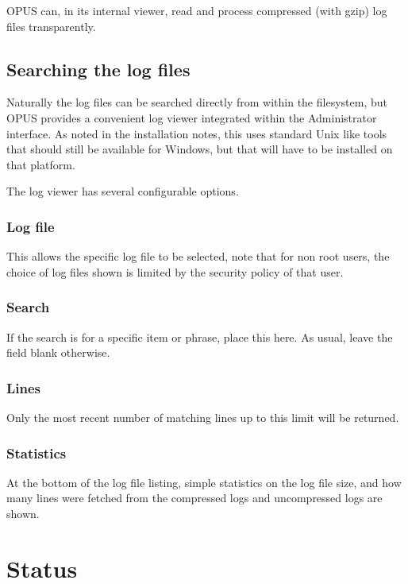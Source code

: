 \documentclass[12 pt]{book}
\begin{document}
OPUS can, in its internal viewer, read and process compressed (with gzip) log files transparently.


\subsection{Searching the log files}

Naturally the log files can be searched directly from within the filesystem, but OPUS provides a
convenient log viewer integrated within the Administrator interface. As noted in the installation notes,
this uses standard Unix like tools that should still be available for Windows, but that will have to
be installed on that platform.

The log viewer has several configurable options.

\subsubsection{Log file}

This allows the specific log file to be selected, note that for non root users, the choice of log files
shown is limited by the security policy of that user.

\subsubsection{Search}

If the search is for a specific item or phrase, place this here. As usual, leave the field blank otherwise.

\subsubsection{Lines}

Only the most recent number of matching lines up to this limit will be returned.

\subsubsection{Statistics}

At the bottom of the log file listing, simple statistics on the log file size, and how many lines were fetched from the compressed logs and uncompressed logs are shown.

\section{Status}
\end{document}
